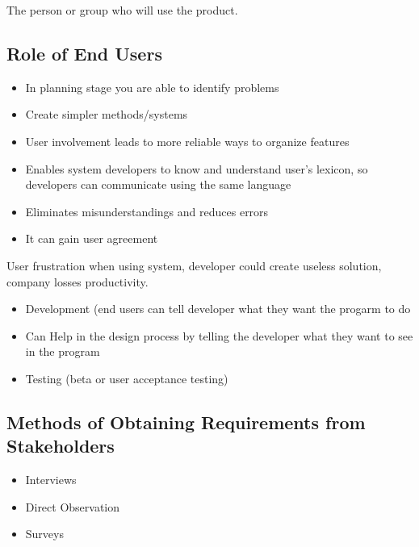 \documentclass[12pt,fleqn]{book} %
\begin{document}
\begin{definition}
  The person or group who will use the product.
\end{definition}\par

\subsection{Role of End Users}
\begin{itemize}
  \item In planning stage you are able to identify problems
  \item Create simpler methods/systems
  \item User involvement leads to more reliable ways to organize features
  \item Enables system developers to know and understand user's lexicon, so developers can communicate using the same language
  \item Eliminates misunderstandings and reduces errors
  \item It can gain user agreement
\end{itemize}

\begin{definition}
  User frustration when using system, developer could create useless solution,
  company losses productivity.
\end{definition}\par

\begin{example}
  \phantom{-}

  \begin{itemize}
    \item Development (end users can tell developer what they want the progarm to do
    \item Can Help in the design process by telling the developer what they want to see in the program
    \item Testing (beta or user acceptance testing)
  \end{itemize}
\end{example}

\subsection{Methods of Obtaining Requirements from Stakeholders}
\begin{itemize}
  \item Interviews
  \item Direct Observation
  \item Surveys
\end{itemize}
\end{document}
